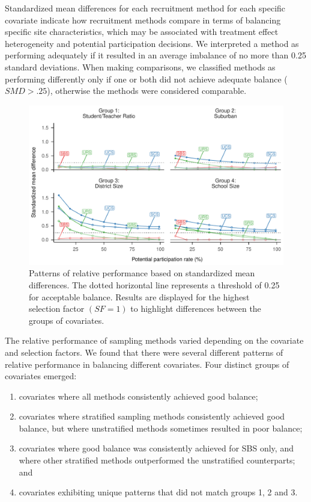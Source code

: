 \documentclass[
  english,
  man,floatsintext]{apa6}
\providecommand{\tightlist}{%
  \setlength{\itemsep}{0pt}\setlength{\parskip}{0pt}}
\begin{document}
Standardized mean differences for each recruitment method for each specific covariate indicate how recruitment methods compare in terms of balancing specific site characteristics, which may be associated with treatment effect heterogeneity and potential participation decisions.
We interpreted a method as performing adequately if it resulted in an average imbalance of no more than 0.25 standard deviations. When making comparisons, we classified methods as performing differently only if one or both did not achieve adequate balance (\(SMD > .25\)), otherwise the methods were considered comparable.



\begin{figure}
\centering
\includegraphics{6---Paper_files/figure-latex/fig-SMD-groups-1.pdf}
\caption{\label{fig:fig-SMD-groups}Patterns of relative performance based on standardized mean differences. The dotted horizontal line represents a threshold of 0.25 for acceptable balance. Results are displayed for the highest selection factor \((SF = 1)\) to highlight differences between the groups of covariates.}
\end{figure}

The relative performance of sampling methods varied depending on the covariate and selection factors. We found that there were several different patterns of relative performance in balancing different covariates. Four distinct groups of covariates emerged:

\begin{enumerate}
\def\labelenumi{(\arabic{enumi})}
\tightlist
\item
  covariates where all methods consistently achieved good balance;
\item
  covariates where stratified sampling methods consistently achieved good balance, but where unstratified methods sometimes resulted in poor balance;
\item
  covariates where good balance was consistently achieved for SBS only, and where other stratified methods outperformed the unstratified counterparts; and\\
\item
  covariates exhibiting unique patterns that did not match groups 1, 2 and 3.
\end{enumerate}
\end{document}
